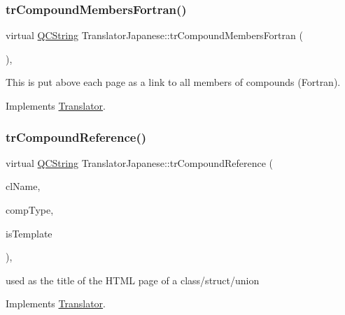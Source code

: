 \subsubsection{\texorpdfstring{trCompoundMembersFortran()}{trCompoundMembersFortran()}}
{\footnotesize\ttfamily virtual \mbox{\hyperlink{class_q_c_string}{Q\+C\+String}} Translator\+Japanese\+::tr\+Compound\+Members\+Fortran (\begin{DoxyParamCaption}{ }\end{DoxyParamCaption})\hspace{0.3cm}{\ttfamily [inline]}, {\ttfamily [virtual]}}

This is put above each page as a link to all members of compounds (Fortran). 

Implements \mbox{\hyperlink{class_translator}{Translator}}.

\mbox{\label{class_translator_japanese_a49fe8e71559f8faea8e38ac93de3c06b}} 
\subsubsection{\texorpdfstring{trCompoundReference()}{trCompoundReference()}}
{\footnotesize\ttfamily virtual \mbox{\hyperlink{class_q_c_string}{Q\+C\+String}} Translator\+Japanese\+::tr\+Compound\+Reference (\begin{DoxyParamCaption}\item[{const char $\ast$}]{cl\+Name,  }\item[{\mbox{\hyperlink{class_class_def_ae70cf86d35fe954a94c566fbcfc87939}{Class\+Def\+::\+Compound\+Type}}}]{comp\+Type,  }\item[{bool}]{is\+Template }\end{DoxyParamCaption})\hspace{0.3cm}{\ttfamily [inline]}, {\ttfamily [virtual]}}

used as the title of the H\+T\+ML page of a class/struct/union 

Implements \mbox{\hyperlink{class_translator}{Translator}}.

\mbox{\label{class_translator_japanese_aadf32871adeb9fca4be7d646fb789f24}} 
